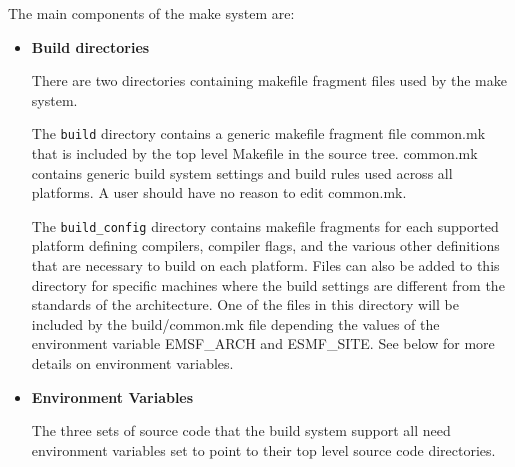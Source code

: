 The main components of the make system are:
\begin{itemize}
\item{{\bf Build directories}}

There are two directories containing makefile fragment files used by
the make system.  

The {\tt build} directory contains a generic makefile fragment file
common.mk that is included by the top level Makefile in the source
tree.  common.mk contains generic build system settings and build
rules used across all platforms.  A user should have no reason to edit
common.mk.

The {\tt build\_config} directory contains makefile fragments for each
supported platform defining compilers, compiler flags, and the various
other definitions that are necessary to build on each platform.  Files
can also be added to this directory for specific machines where the
build settings are different from the standards of the architecture.
One of the files in this directory will be included by the
build/common.mk file depending the values of the environment variable
EMSF\_ARCH and ESMF\_SITE.  See below for more details on environment
variables.

\item{{\bf Environment Variables}}

The three sets of source code that the build system support all need
environment variables set to point to their top level source code
directories. 

\end{itemize}
